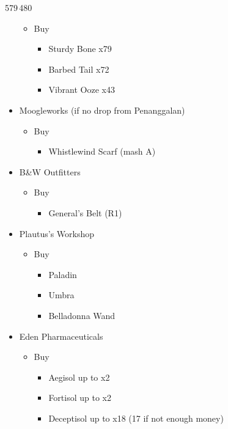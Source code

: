 \begin{shop}{579\,480}
\begin{itemize}
			\begin{itemize}
				\item Buy
					\begin{itemize}
						\item Sturdy Bone x79
						\item Barbed Tail x72
						\item Vibrant Ooze x43
					\end{itemize}
			\end{itemize}
		\item Moogleworks (if no drop from Penanggalan)
			\begin{itemize}
				\item Buy
					\begin{itemize}
						\item Whistlewind Scarf (mash A)
					\end{itemize}
			\end{itemize}	
		\item B\&W Outfitters
			\begin{itemize}
				\item Buy
					\begin{itemize}
						\item General's Belt (R1)
					\end{itemize}
			\end{itemize}
		\item Plautus's Workshop
			\begin{itemize}
				\item Buy
					\begin{itemize}
						\item Paladin
						\item Umbra
						\item Belladonna Wand
					\end{itemize}
			\end{itemize}	
		\item Eden Pharmaceuticals
			\begin{itemize}
				\item Buy
					\begin{itemize}
						\item Aegisol up to x2
						\item Fortisol up to x2
						\item Deceptisol up to x18 (17 if not enough money)
					\end{itemize}
			\end{itemize}											
	\end{itemize}
\end{shop}

